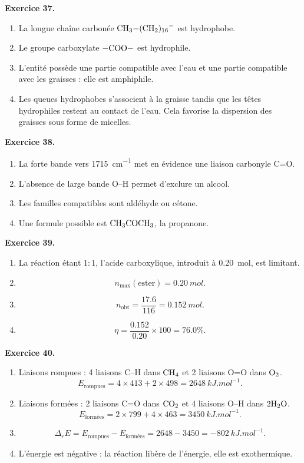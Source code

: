 \documentclass[11pt,a4paper]{article}
\newcommand{\corr}[2]{
  \begin{correctionbox}
  \textbf{Exercice #1.} #2
  \end{correctionbox}
}
\begin{document}
\corr{37}{
\begin{enumerate}
  \item La longue chaîne carbonée $\ce{CH3-(CH2)16-}$ est hydrophobe.
  \item Le groupe carboxylate $\ce{-COO-}$ est hydrophile.
  \item L'entité possède une partie compatible avec l'eau et une partie compatible avec les graisses : elle est amphiphile.
  \item Les queues hydrophobes s'associent à la graisse tandis que les têtes hydrophiles restent au contact de l'eau. Cela favorise la dispersion des graisses sous forme de micelles.
\end{enumerate}
}

\corr{38}{
\begin{enumerate}
  \item La forte bande vers \SI{1715}{cm^{-1}} met en évidence une liaison carbonyle C=O.
  \item L'absence de large bande O--H permet d'exclure un alcool.
  \item Les familles compatibles sont aldéhyde ou cétone.
  \item Une formule possible est $\ce{CH3COCH3}$, la propanone.
\end{enumerate}
}

\corr{39}{
\begin{enumerate}
  \item La réaction étant $1:1$, l'acide carboxylique, introduit à \SI{0.20}{mol}, est limitant.
  \item
  \[
  n_{\max}(\text{ester})=\SI{0.20}{mol}.
  \]
  \item
  \[
  n_{\text{obt}}=\frac{17.6}{116}=\SI{0.152}{mol}.
  \]
  \item
  \[
  \eta=\frac{0.152}{0.20}\times 100=76.0\%.
  \]
\end{enumerate}
}

\corr{40}{
\begin{enumerate}
  \item Liaisons rompues : 4 liaisons C--H dans $\ce{CH4}$ et 2 liaisons O=O dans $\ce{O2}$.
  \[
  E_{\text{rompues}}=4\times 413+2\times 498=\SI{2648}{kJ.mol^{-1}}.
  \]
  \item Liaisons formées : 2 liaisons C=O dans $\ce{CO2}$ et 4 liaisons O--H dans $2\ce{H2O}$.
  \[
  E_{\text{formées}}=2\times 799+4\times 463=\SI{3450}{kJ.mol^{-1}}.
  \]
  \item
  \[
  \Delta_rE=E_{\text{rompues}}-E_{\text{formées}}
  =2648-3450=\SI{-802}{kJ.mol^{-1}}.
  \]
  \item L'énergie est négative : la réaction libère de l'énergie, elle est exothermique.
\end{enumerate}
}
\end{document}
